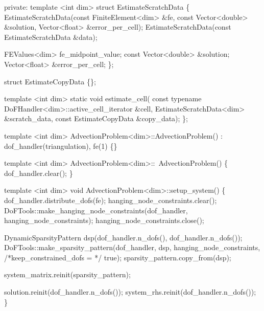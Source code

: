 \begin{DoxyCodeInclude}
\textcolor{keyword}{private}:
    \textcolor{keyword}{template} <\textcolor{keywordtype}{int} dim>
    \textcolor{keyword}{struct }EstimateScratchData \{
        EstimateScratchData(\textcolor{keyword}{const} FiniteElement<dim> &fe,
                            \textcolor{keyword}{const} Vector<double> &solution,
                            Vector<float> &error\_per\_cell);
        EstimateScratchData(\textcolor{keyword}{const} EstimateScratchData &data);

        FEValues<dim> fe\_midpoint\_value;
        \textcolor{keyword}{const} Vector<double> &solution;
        Vector<float> &error\_per\_cell;
    \};

    \textcolor{keyword}{struct }EstimateCopyData \{\};

    \textcolor{keyword}{template} <\textcolor{keywordtype}{int} dim>
    \textcolor{keyword}{static} \textcolor{keywordtype}{void} estimate\_cell(
        \textcolor{keyword}{const} \textcolor{keyword}{typename} DoFHandler<dim>::active\_cell\_iterator &cell,
        EstimateScratchData<dim> &scratch\_data,
        \textcolor{keyword}{const} EstimateCopyData &copy\_data);
\};




\textcolor{keyword}{template} <\textcolor{keywordtype}{int} dim>
AdvectionProblem<dim>::AdvectionProblem() : dof\_handler(triangulation), fe(1)
\{\}


\textcolor{keyword}{template} <\textcolor{keywordtype}{int} dim>
AdvectionProblem<dim>::~AdvectionProblem()
\{
    dof\_handler.clear();
\}


\textcolor{keyword}{template} <\textcolor{keywordtype}{int} dim>
\textcolor{keywordtype}{void} AdvectionProblem<dim>::setup\_system()
\{
    dof\_handler.distribute\_dofs(fe);
    hanging\_node\_constraints.clear();
    DoFTools::make\_hanging\_node\_constraints(dof\_handler,
                                            hanging\_node\_constraints);
    hanging\_node\_constraints.close();

    DynamicSparsityPattern dsp(dof\_handler.n\_dofs(), dof\_handler.n\_dofs());
    DoFTools::make\_sparsity\_pattern(dof\_handler, dsp, hanging\_node\_constraints,
                                    \textcolor{comment}{/*keep\_constrained\_dofs = */} \textcolor{keyword}{true});
    sparsity\_pattern.copy\_from(dsp);

    system\_matrix.reinit(sparsity\_pattern);

    solution.reinit(dof\_handler.n\_dofs());
    system\_rhs.reinit(dof\_handler.n\_dofs());
\}



\end{DoxyCodeInclude}
